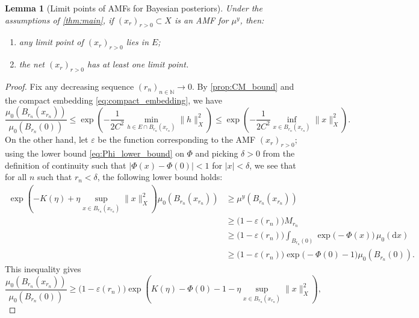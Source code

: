\documentclass[11pt]{article}
\newcommand*{\cball}[2]{B_{#2}(#1)}
\newcommand*{\Naturals}{\mathbb{N}}
\newcommand*{\rd}{\mathrm{d}}
\renewcommand*{\geq}{\geqslant}
\renewcommand*{\leq}{\leqslant}
\theoremstyle{plain}
\newtheorem{lemma}[theorem]{Lemma}
\theoremstyle{definition}
\newcommand{\absval}[1]{\lvert #1 \rvert}
\newcommand{\norm}[1]{\lVert #1 \rVert}
\numberwithin{equation}{section}
\numberwithin{figure}{section}
\numberwithin{table}{section}
\begin{document}
\begin{lemma}[Limit points of AMFs for Bayesian posteriors]
	\label{lem:AMF_has_limit_point}
	Under the assumptions of \cref{thm:main}, if $(x_r)_{r > 0} \subset X$ is an AMF for $\mu^y$, then:
	\begin{enumerate}[label=(\alph*)]
		\item any limit point of $(x_r)_{r > 0}$ lies in $E$;
		\item the net $(x_r)_{r > 0}$ has at least one limit point.
	\end{enumerate}
\end{lemma}

\begin{proof}
	Fix any decreasing sequence $(r_n)_{n \in \Naturals} \to 0$.
	By \cref{prop:CM_bound} and the compact embedding \eqref{eq:compact_embedding}, we have
	\begin{equation}\label{eq:AMF_bounded_upper_bound}
		\frac{\mu_0(\cball{x_{r_n}}{r_n})}{\mu_0(\cball{0}{r_n})} \leq \exp\left(-\frac{1}{2C^{2}} \min_{h \in E \cap \cball{x_{r_n}}{r_n}} \|h\|_X^{2}\right) \leq \exp\left(-\frac{1}{2C^{2}} \inf_{x \in \cball{x_{r_n}}{r_{n}}} \norm{x}_{X}^{2} \right).
	\end{equation}
	On the other hand, let $\varepsilon$ be the function corresponding to the AMF $(x_{r})_{r > 0}$;
	using the lower bound \eqref{eq:Phi_lower_bound} on $\Phi$ and picking $\delta > 0$ from the definition of continuity such that $\absval{\Phi(x) - \Phi(0)} < 1$ for $\absval{x} < \delta$, we see that for all $n$ such that $r_n < \delta$, the following lower bound holds:
	\begin{align*}
		\exp\left(-K(\eta) + \eta \sup_{x \in \cball{x_{r_n}}{r_{n}}} \norm{x}_{X}^2\right) \mu_0(\cball{x_{r_n}}{r_n})
		&\geq \mu^y(\cball{x_{r_n}}{r_n}) \\
		&\geq \bigl(1 - \varepsilon(r_n)\bigr) M_{r_n} \\
		&\geq \bigl(1-\varepsilon(r_n)\bigr) \int_{\cball{0}{r_n}} \exp\bigl(-\Phi(x)\bigr)\,\mu_0(\rd x) \\
		&\geq \bigl(1 - \varepsilon(r_n)\bigr) \exp\bigl(-\Phi(0) - 1\bigr) \mu_0(\cball{0}{r_n}).
	\end{align*}
	This inequality gives
	\begin{equation} \label{eq:AMF_bounded_lower_bound}
		\frac{\mu_0(\cball{x_{r_n}}{r_n})}{\mu_0(\cball{0}{r_n})} \geq \bigl(1 - \varepsilon(r_n)\bigr) \exp\left(K(\eta) - \Phi(0) - 1 -\eta \sup_{x \in \cball{x_{r_n}}{r_{n}}} \norm{x}_{X}^{2} \right),
	\end{equation}

\end{proof}
\end{document}
